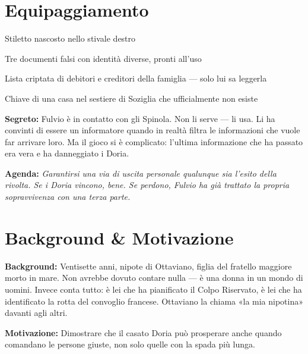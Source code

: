 \section*{Equipaggiamento}
\begin{goldlist}
  \item Stiletto nascosto nello stivale destro
  \item Tre documenti falsi con identità diverse, pronti all'uso
  \item Lista criptata di debitori e creditori della famiglia — solo lui sa leggerla
  \item Chiave di una casa nel sestiere di Soziglia che ufficialmente non esiste
\end{goldlist}

\clearpage

\begin{secretbox}
  \textbf{Segreto:} Fulvio è in contatto con gli Spinola. Non li serve — li usa. Li ha
  convinti di essere un informatore quando in realtà filtra le informazioni che vuole
  far arrivare loro. Ma il gioco si è complicato: l'ultima informazione che ha passato
  era vera e ha danneggiato i Doria.

  \medskip\noindent\textcolor{SecretRed}{\textbf{Agenda:}}
  \textit{Garantirsi una via di uscita personale qualunque sia l'esito della rivolta.
  Se i Doria vincono, bene. Se perdono, Fulvio ha già trattato la propria
  sopravvivenza con una terza parte.}
\end{secretbox}

\clearpage



\section*{Background \& Motivazione}
\begin{rulebox}{}
  \textbf{Background:} Ventisette anni, nipote di Ottaviano, figlia del fratello maggiore
  morto in mare. Non avrebbe dovuto contare nulla — è una donna in un mondo di uomini.
  Invece conta tutto: è lei che ha pianificato il Colpo Riservato, è lei che ha
  identificato la rotta del convoglio francese. Ottaviano la chiama «la mia nipotina»
  davanti agli altri.

  \medskip\noindent\textcolor{DoriaBlue}{\textbf{Motivazione:}} Dimostrare che il casato
  Doria può prosperare anche quando comandano le persone giuste, non solo quelle con la
  spada più lunga.
\end{rulebox}

